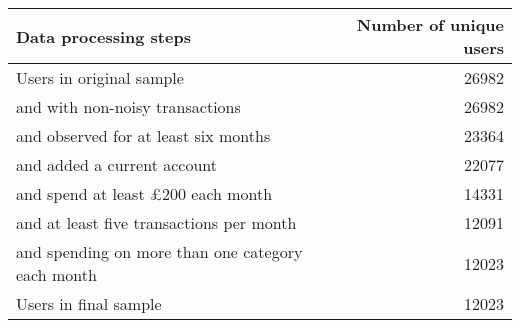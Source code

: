 \begin{tabular}{lr}
\toprule
                                   Data processing steps &  Number of unique users \\
\midrule
                                Users in original sample &                   26982 \\
                   \quad and with non-noisy transactions &                   26982 \\
              \quad and observed for at least six months &                   23364 \\
                       \quad and added a current account &                   22077 \\
          \quad and spend at least \pounds200 each month &                   14331 \\
          \quad and at least five transactions per month &                   12091 \\
 \quad and spending on more than one category each month &                   12023 \\
                                   Users in final sample &                   12023 \\
\bottomrule
\end{tabular}
